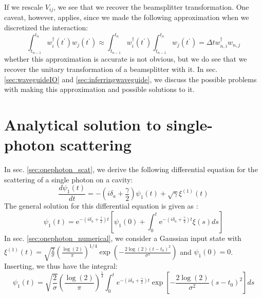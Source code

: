 If we rescale $V_{ij}$, we see that we recover the beamsplitter transformation. One caveat, however, applies, since we made the following approximation when we discretized the interaction:
\begin{equation}
    \int_{t_{n-1}}^{t_n} w_i^\dagger(t^\prime) w_j(t^\prime) \approx \int_{t_{n-1}}^{t_n} w_i^\dagger(t^\prime) \int_{t_{n-1}}^{t_n} w_j(t^\prime) = \Delta t w_{n,i}^\dagger w_{n,j}
\end{equation}
whether this approximation is accurate is not obvious, but we do see that we recover the unitary transformation of a beamsplitter with it. In sec. \ref{sec:waveguideIO} and \ref{sec:inferringwaveguide}, we discuss the possible problems with making this approximation and possible solutions to it. 





\section{Analytical solution to single-photon scattering \label{app:analytical}}

In sec. \ref{sec:onephoton_scat}, we derive the following differential equation for the scattering of a single photon on a cavity:  
\begin{equation}
    \frac{d \psi_1(t)}{d t}  = -(i \delta_a +\frac{\gamma}{2}) \psi_1(t) + \sqrt{\gamma} \xi^{(1)}(t)
\end{equation}
The general solution for this differential equation is given as \cite{Arfken2005MathematicalPhysicists}:
\begin{equation}
\psi_1(t) =  \mathrm{e}^{-(i\delta_a+\frac{\gamma}{2}) t} \left [ \psi_1(0) + \int_{0}^t \mathrm{e}^{-(i\delta_a+\frac{\gamma}{2}) t} \xi(s)  ds \right ]
\end{equation}
In sec. \ref{sec:onephoton_numerical}, we consider a Gaussian input state with $\xi^{(1)}(t) = \sqrt{\frac{2}{\sigma}} \left(\frac{\log(2)}{\pi}\right)^{1/4} \exp\left(-\frac{2\log(2)(t-t_0)^2}{\sigma^2}\right) $ and $\psi_1(0)=0$.
Inserting, we thus have the integral:
\begin{equation}
\psi_1(t) = \sqrt{\frac{2}{\sigma}}\left(\frac{\log(2)}{\pi}\right)^{\frac{1}{4}}\int_{0}^t e^{-(i\delta_a+\frac{\gamma}{2})t}\exp\left[-\frac{2\log(2)}{\sigma^2}(s-t_0)^2\right] ds
\end{equation}

